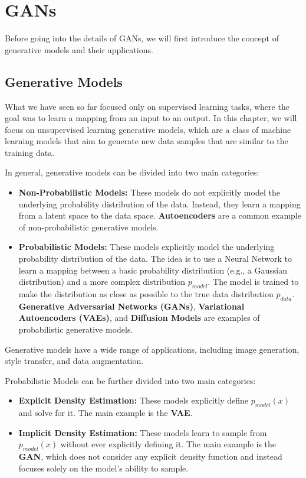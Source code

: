 \section{GANs}
Before going into the details of GANs, we will first introduce the concept of generative models and their applications.

\subsection{Generative Models}
What we have seen so far focused only on supervised learning tasks, where the goal was to learn a mapping from an input to an output.
In this chapter, we will focus on unsupervised learning generative models, which are a class of machine learning models that aim to generate new data samples that are similar to the training data.

In general, generative models can be divided into two main categories:
\begin{itemize}
    \item \textbf{Non-Probabilistic Models:} These models do not explicitly model the underlying probability distribution of the data. 
    Instead, they learn a mapping from a latent space to the data space. \textbf{Autoencoders} are a common example of non-probabilistic generative models.
    \item \textbf{Probabilistic Models:} These models explicitly model the underlying probability distribution of the data.
    The idea is to use a Neural Network to learn a mapping between a basic probability distribution (e.g., a Gaussian distribution) and a more complex distribution $p_{model}$.
    The model is trained to make the distribution as close as possible to the true data distribution $p_{data}$.
    \textbf{Generative Adversarial Networks (GANs)}, \textbf{Variational Autoencoders (VAEs)}, and \textbf{Diffusion Models} are examples of probabilistic generative models.
\end{itemize}

Generative models have a wide range of applications, including image generation, style transfer, and data augmentation.


Probabilistic Models can be further divided into two main categories:
\begin{itemize}
    \item \textbf{Explicit Density Estimation:} These models explicitly define $p_{model}(x)$ and solve for it.
    The main example is the \textbf{VAE}.

    \item \textbf{Implicit Density Estimation:} These models learn to sample from $p_{model}(x)$ without ever explicitly defining it.
    The main example is the \textbf{GAN}, which does not consider any explicit density function and instead focuses solely on the model's ability to sample.
\end{itemize}

